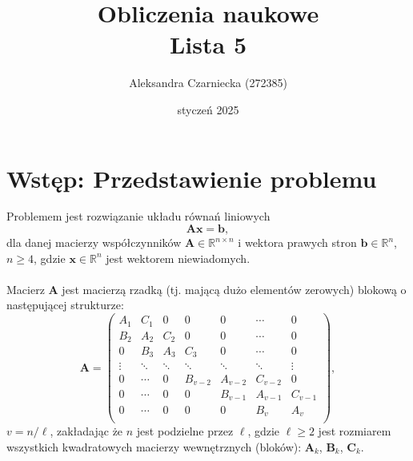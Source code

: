 \documentclass{article}
\title{\textbf{Obliczenia naukowe \\ \large Lista 5}}
\author{Aleksandra Czarniecka (272385)}
\date{styczeń 2025}
\begin{document}
\maketitle
\section*{Wstęp: Przedstawienie problemu}
	Problemem jest rozwiązanie układu równań liniowych
	\[\mathbf{A} \mathbf{x} = \mathbf{b},\]
	dla danej macierzy współczynników $\mathbf{A}  \in \mathbb{R}^{n \times n}$
	i wektora prawych stron $\mathbf{b} \in \mathbb{R}^n$, $n \geq 4$, gdzie $\mathbf{x} \in \mathbb{R}^n$ jest wektorem niewiadomych. \\ \\
	\noindent Macierz $\mathbf{A}$ jest macierzą rzadką (tj. mającą dużo elementów zerowych) blokową o następującej strukturze:
	$$
	\mathbf{A} =
	\left(\begin{array}{ccccccc}
	A_1 & C_1 & 0 & 0 & 0 & \cdots & 0 \\
	B_2 & A_2 & C_2 & 0 & 0  & \cdots & 0 \\
	0  & B_3 & A_3 & C_3 & 0  & \cdots & 0 \\
	\vdots & \ddots & \ddots & \ddots & \ddots & \ddots & \vdots\\
	0   & \cdots & 0  & B_{v-2} & A_{v-2} & C_{v-2} & 0 \\
	0  & \cdots & 0  & 0 &B_{v-1} & A_{v-1} & C_{v-1}  \\
	0  & \cdots & 0& 0 & 0 & B_{v} & A_{v}  \\
	\end{array}\right),
	$$
	$v = n/\ell$, zakładając że $n$ jest podzielne przez $\ell$, gdzie $\ell \geq 2$ jest rozmiarem wszystkich kwadratowych macierzy wewnętrznych (bloków): $\mathbf{A}_k$, $\mathbf{B}_k$, $\mathbf{C}_k$. \\ \\
	
\end{document}

